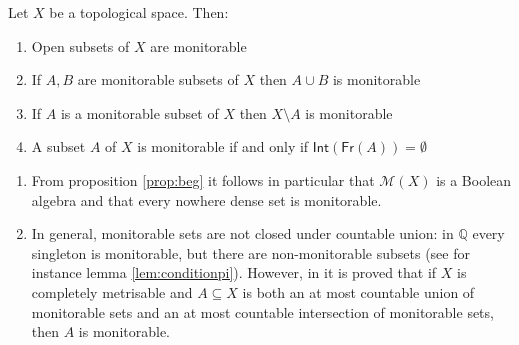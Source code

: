 \documentclass{lmcs}
\newcommand{\Q}{\mathbb Q}
\newcommand{\Int}[1]{\mathsf{Int}(#1)}
\newcommand{\Fr}[1]{\mathsf{Fr}(#1)}
\begin{document}
\begin{prop} \label{prop:beg}
Let $X$ be a topological space.
Then:
\begin{enumerate}
\item\label{prop:beg:1} Open subsets of $X$ are monitorable
\item\label{prop:beg:2} If $A,B$ are monitorable subsets of $X$ then $A\cup B$ is monitorable
\item\label{prop:beg:3} If $A$ is a monitorable subset of $X$ then $X\setminus A$ is monitorable
\item\label{prop:beg:4} A subset $A$ of $X$ is monitorable if and only if $ \Int{ \Fr{A} }=\emptyset $
\end{enumerate}
\end{prop}

\begin{rem}
\begin{enumerate}
\item From proposition \ref{prop:beg} it follows in particular that $ \mathcal M (X)$ is a Boolean algebra and that every nowhere dense set is monitorable.
\item In general, monitorable sets are not closed under countable union: in $ \Q $ every singleton is monitorable, but there are non-monitorable subsets (see for instance lemma \ref{lem:conditionpi}).
However, in \cite[theorem 1]{dieker2014} it is proved that if $X$ is completely metrisable and $A\subseteq X$ is both an at most countable union of monitorable sets and an at most countable intersection of monitorable sets, then $A$ is monitorable.
\end{enumerate}
\end{rem}
\end{document}
